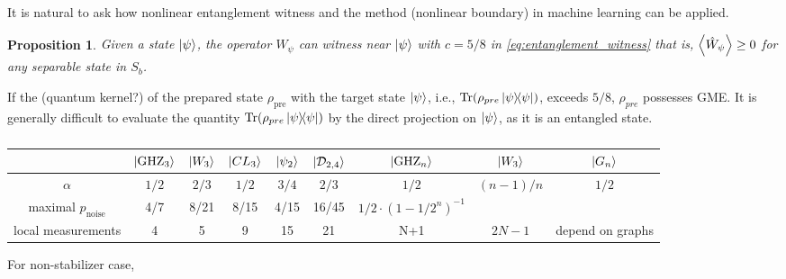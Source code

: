 \documentclass[
10pt,
aps,
pra,
linenumbers,
floatfix,
]{revtex4-2}
\theoremstyle{plain}
\newtheorem{proposition}{Proposition}
\theoremstyle{definition}
\newcommand{\ew}{\hat{W}}
\newcommand{\ghz}{\text{GHZ}}
\newcommand{\noise}{\text{noise}}
\newcommand{\dm}{\rho}
\newcommand{\D}{\mathcal{D}}
\begin{document}
It is natural to ask how nonlinear entanglement witness \cite{guhneNonlinearEntanglementWitnesses2006}  and the  method (nonlinear boundary) in machine learning can be applied. 

\begin{proposition}\label{thm:entanglement_witness_gme}
	Given a state $\ket{\psi}$,
	the  operator $\ew_{\psi}$ can witness   near $\ket{\psi}$ with $c=5/8$ in \cref{eq:entanglement_witness}
	that is, $\expval{\ew_{\psi}}\ge 0$ for any separable state in $S_b$.
\end{proposition}
If the  (quantum kernel?) of the prepared state $\dm_{\text{pre}}$ with the target state $\ket{\psi}$, i.e., $\Tr(\dm_{pre}\op{\psi})$, exceeds $5/8$, $\dm_{pre}$ possesses GME.
It is generally difficult to evaluate the quantity $\Tr(\dm_{pre}\op{\psi})$ by the direct projection on $\ket{\psi}$, as it is an entangled state.
\begin{table}[!ht]
\centering
\begin{tabular}{c|c|c|c|c|c|c|c|c}
	 & $\ket{\ghz_3}$ & $\ket{W_3}$ & $\ket{CL_3}$ & $\ket{\psi_2}$ & $\ket{\D_{2,4}}$ & $\ket{\ghz_n}$ & $\ket{W_3}$ & $\ket{G_n}$ \\
	\hline
	$\alpha$ & $1/2$ & $2/3$ & $1/2$ & $3/4$ & $2/3$ & $1/2$ & $(n-1)/n$ & $1/2$ \\
	maximal $p_{\noise}$ & 4/7 & 8/21 & 8/15 & 4/15 & 16/45 & $1/2 \cdot (1-1/2^n)^{-1}$ & & \\
	local measurements & 4 & 5 & 9 & 15 & 21 & N+1 & $2N-1$ & depend on graphs \\
	\hline
\end{tabular}
\caption{\cite{guhneEntanglementDetection2009}}
\end{table}

For non-stabilizer case, \cite{zhangEfficientEntanglementGeneration2021} \cite{zhuMachineLearningDerivedEntanglement2021}
\end{document}
